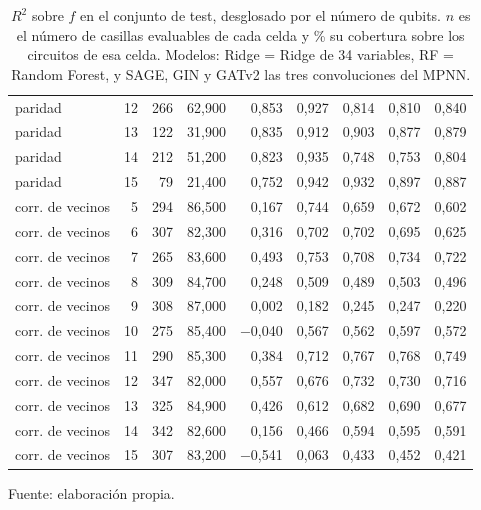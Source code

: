 \begin{table}[htbp]
{\begin{tabular}{@{}lrrrrrrrr@{}}
        paridad & 12 & 266 & 62,900 & 0,853 & 0,927 & 0,814 & 0,810 & 0,840 \\
        paridad & 13 & 122 & 31,900 & 0,835 & 0,912 & 0,903 & 0,877 & 0,879 \\
        paridad & 14 & 212 & 51,200 & 0,823 & 0,935 & 0,748 & 0,753 & 0,804 \\
        paridad & 15 & 79 & 21,400 & 0,752 & 0,942 & 0,932 & 0,897 & 0,887 \\
        corr. de vecinos & 5 & 294 & 86,500 & 0,167 & 0,744 & 0,659 & 0,672 & 0,602 \\
        corr. de vecinos & 6 & 307 & 82,300 & 0,316 & 0,702 & 0,702 & 0,695 & 0,625 \\
        corr. de vecinos & 7 & 265 & 83,600 & 0,493 & 0,753 & 0,708 & 0,734 & 0,722 \\
        corr. de vecinos & 8 & 309 & 84,700 & 0,248 & 0,509 & 0,489 & 0,503 & 0,496 \\
        corr. de vecinos & 9 & 308 & 87,000 & 0,002 & 0,182 & 0,245 & 0,247 & 0,220 \\
        corr. de vecinos & 10 & 275 & 85,400 & $-$0,040 & 0,567 & 0,562 & 0,597 & 0,572 \\
        corr. de vecinos & 11 & 290 & 85,300 & 0,384 & 0,712 & 0,767 & 0,768 & 0,749 \\
        corr. de vecinos & 12 & 347 & 82,000 & 0,557 & 0,676 & 0,732 & 0,730 & 0,716 \\
        corr. de vecinos & 13 & 325 & 84,900 & 0,426 & 0,612 & 0,682 & 0,690 & 0,677 \\
        corr. de vecinos & 14 & 342 & 82,600 & 0,156 & 0,466 & 0,594 & 0,595 & 0,591 \\
        corr. de vecinos & 15 & 307 & 83,200 & $-$0,541 & 0,063 & 0,433 & 0,452 & 0,421 \\
        \bottomrule
    \end{tabular}}

    \caption{$R^2$ sobre $f$ en el conjunto de test, desglosado por el número de qubits. $n$ es el número de casillas evaluables de cada celda y \% su cobertura sobre los circuitos de esa celda. Modelos: Ridge = Ridge de 34 variables, RF = Random Forest, y SAGE, GIN y GATv2 las tres convoluciones del MPNN.}
    \label{tab:v2_tamano_r2_f}

    {\footnotesize Fuente: elaboración propia.}
\end{table}
